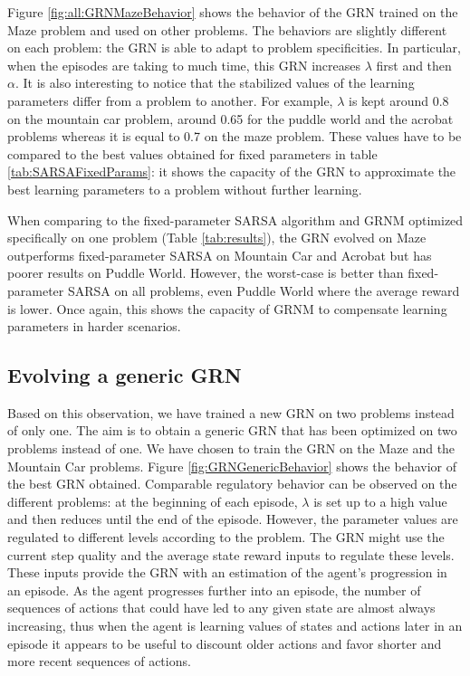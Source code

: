 Figure \ref{fig:all:GRNMazeBehavior} shows the behavior of the GRN trained on the Maze problem and used on other problems. The behaviors are slightly different on each problem: the GRN is able to adapt to problem specificities. In particular, when the episodes are taking to much time, this GRN increases $\lambda$ first and then $\alpha$. It is also interesting to notice that the stabilized values of the learning parameters differ from a problem to another. For example, $\lambda$ is kept around 0.8 on the mountain car problem, around 0.65 for the puddle world and the acrobat problems whereas it is equal to 0.7 on the maze problem. These values have to be compared to the best values obtained for fixed parameters in table \ref{tab:SARSAFixedParams}: it shows the capacity of the GRN to approximate the best learning parameters to a problem without further learning.

When comparing to the fixed-parameter SARSA algorithm and GRNM optimized specifically on one problem (Table \ref{tab:results}), the GRN evolved on Maze outperforms fixed-parameter SARSA on Mountain Car and Acrobat but has poorer results on Puddle World. However, the worst-case is better than fixed-parameter SARSA on all problems, even Puddle World where the average reward is lower. Once again, this shows the capacity of GRNM to compensate learning parameters in harder scenarios.

\subsection{Evolving a generic GRN}
Based on this observation, we have trained a new GRN on two problems instead of only one. The aim is to obtain a generic GRN that has been optimized on two problems instead of one. We have chosen to train the GRN on the Maze and the Mountain Car problems. Figure \ref{fig:GRNGenericBehavior} shows the behavior of the best GRN obtained. Comparable regulatory behavior can be observed on the different problems: at the beginning of each episode, $\lambda$ is set up to a high value and then reduces until the end of the episode. However, the parameter values are regulated to different levels according to the problem. The GRN might use the current step quality and the average state reward inputs to regulate these levels. These inputs provide the GRN with an estimation of the agent's progression in an episode. As the agent progresses further into an episode, the number of sequences of actions that could have led to any given state are almost always increasing, thus when the agent is learning values of states and actions later in an episode it appears to be useful to discount older actions and favor shorter and more recent sequences of actions.

